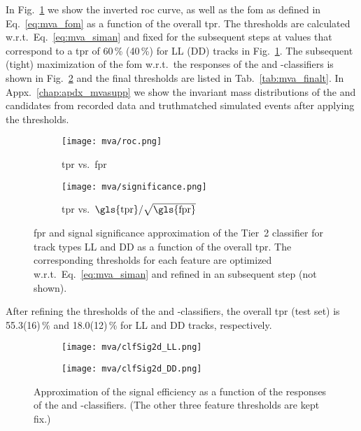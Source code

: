 In Fig.~\ref{fig:mva_significance} we show the inverted \gls{roc} curve, as well as the \gls{fom} as defined in Eq.~\eqref{eq:mva_fom} as a function of the overall \gls{tpr}.
The thresholds are calculated w.r.t.\ Eq.~\eqref{eq:mva_siman} and fixed for the subsequent steps at values that correspond to a \gls{tpr} of 60\,\% (40\,\%) for \gls{LL} (\gls{DD}) tracks in Fig.~\ref{fig:mva_significance}.
The subsequent (tight) maximization of the \gls{fom} w.r.t.\ the responses of the \Lz and \Lb-\Dz classifiers is shown in Fig.~\ref{fig:mva_clfSigs} and the final thresholds are listed in Tab.~\ref{tab:mva_finalt}.
In Appx.~\ref{chap:apdx_mvasupp} we show the invariant mass distributions of the \Dz and \Lz candidates from recorded data and \gls{truthmatched} simulated events after applying the thresholds.
\begin{figure}[htbp]
    \centering
    \begin{subfigure}{.49\textwidth}
        \centering
        \texttt{[image: mva/roc.png]}
        \caption{\Gls{tpr} vs.\ \gls{fpr}}
    \end{subfigure}
    \begin{subfigure}{.49\textwidth}
        \centering
        \texttt{[image: mva/significance.png]}
        \caption{\Gls{tpr} vs.\ $\text{\gls{tpr}} / \sqrt{\text{\gls{fpr}}}$}
    \end{subfigure}
    \caption{\Gls{fpr} and signal significance approximation of the Tier~2 classifier for track types \gls{LL} and \gls{DD} as a function of the overall \gls{tpr}. The corresponding thresholds for each feature are optimized w.r.t.\ Eq.~\eqref{eq:mva_siman} and refined in an subsequent step (not shown).}
    \label{fig:mva_significance}
\end{figure}
After refining the thresholds of the \Lz and \Lb-\Dz classifiers, the overall \gls{tpr} (test set) is 55.3(16)\,\% and 18.0(12)\,\% for \gls{LL} and \gls{DD} tracks, respectively.

\begin{figure}[htbp]
    \centering
    \begin{subfigure}{.49\textwidth}
        \centering
        \texttt{[image: mva/clfSig2d\_LL.png]}
    \end{subfigure}
    \begin{subfigure}{.49\textwidth}
        \centering
        \texttt{[image: mva/clfSig2d\_DD.png]}
    \end{subfigure}
    \caption{Approximation of the signal efficiency as a function of the responses of the \Lz and \Lb-\Dz classifiers. (The other three feature thresholds are kept fix.)}
    \label{fig:mva_clfSigs}
\end{figure}

